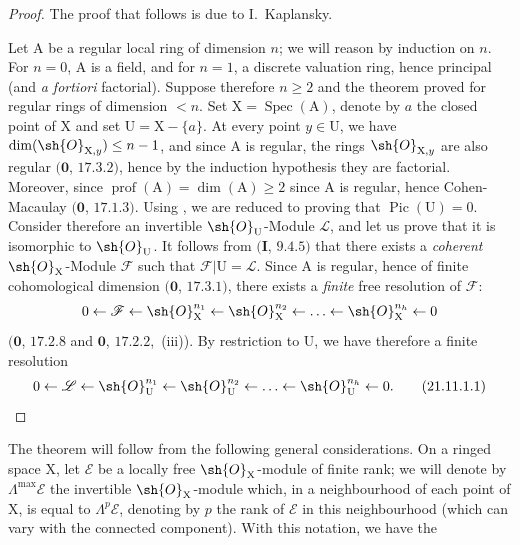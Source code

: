 \begin{proof}
The proof that follows is due to I.~Kaplansky.

Let $\mathrm{A}$ be a regular local ring of dimension $n$; we will reason by induction on $n$.
For $n=0$, $\mathrm{A}$ is a field, and for $n=1$, a discrete valuation ring, hence principal (and \emph{a fortiori} factorial).
Suppose therefore $n\geq 2$ and the theorem proved for regular rings of dimension $<n$.
Set $\mathrm{X}=\operatorname{Spec}(\mathrm{A})$, denote by $a$ the closed point of $\mathrm{X}$ and set $\mathrm{U}=\mathrm{X}-\{a\}$.
At every point $y\in\mathrm{U}$, we have $\dim(\sh{O}_{\mathrm{X},y})\leq n-1$, and since $\mathrm{A}$ is regular, the rings $\sh{O}_{\mathrm{X},y}$ are also regular $(\mathbf{0}$, $17.3.2)$, hence by the induction hypothesis they are factorial.
Moreover, since $\operatorname{prof}(\mathrm{A})=\dim(\mathrm{A})\geq 2$ since $\mathrm{A}$ is regular, hence Cohen-Macaulay $(\mathbf{0}$, $17.1.3)$.
Using , we are reduced to proving that $\operatorname{Pic}(\mathrm{U})=0$.
Consider therefore an invertible $\sh{O}_{\mathrm{U}}$-Module $\mathscr{L}$, and let us prove that it is isomorphic to $\sh{O}_{\mathrm{U}}$.
It follows from $(\mathbf{I}$, $9.4.5)$ that there exists a \emph{coherent} $\sh{O}_{\mathrm{X}}$-Module $\mathscr{F}$ such that $\mathscr{F}|\mathrm{U}=\mathscr{L}$.
Since $\mathrm{A}$ is regular, hence of finite cohomological dimension $(\mathbf{0}$, $17.3.1)$, there exists a \emph{finite} free resolution of $\mathscr{F}$:
\[
  0\leftarrow\mathscr{F}\leftarrow\sh{O}_{\mathrm{X}}^{n_1}\leftarrow\sh{O}_{\mathrm{X}}^{n_2}\leftarrow\ldots\leftarrow\sh{O}_{\mathrm{X}}^{n_h}\leftarrow 0
\]
$(\mathbf{0}$, $17.2.8$ and $\mathbf{0}$, $17.2.2$,~(iii)).
By restriction to $\mathrm{U}$, we have therefore a finite resolution
\[
\label{IV.21.11.1.1}
  0\leftarrow\mathscr{L}\leftarrow\sh{O}_{\mathrm{U}}^{n_1}\leftarrow\sh{O}_{\mathrm{U}}^{n_2}\leftarrow\ldots\leftarrow\sh{O}_{\mathrm{U}}^{n_h}\leftarrow 0.
  \tag{21.11.1.1}
\]
\end{proof}

The theorem will follow from the following general considerations.
On a ringed space $\mathrm{X}$, let $\mathscr{E}$ be a locally free $\sh{O}_{\mathrm{X}}$-module of finite rank; we will denote by $\Lambda^{\max}\mathscr{E}$ the invertible $\sh{O}_{\mathrm{X}}$-module which, in a neighbourhood of each point of $\mathrm{X}$, is equal to $\Lambda^p\mathscr{E}$, denoting by $p$ the rank of $\mathscr{E}$ in this neighbourhood (which can vary with the connected component).
With this notation, we have the

